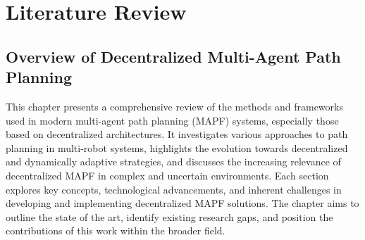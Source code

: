 \chapter{Literature Review}
\label{chap:literature_review}
\section{Overview of Decentralized Multi-Agent Path Planning}
This chapter presents a comprehensive review of the methods and frameworks used in modern multi-agent path planning (MAPF) systems, especially those based on decentralized architectures.
It investigates various approaches to path planning in multi-robot systems, highlights the evolution towards decentralized and dynamically adaptive strategies, and discusses the increasing relevance of decentralized MAPF in complex and uncertain environments. Each section explores key concepts, technological advancements, and inherent challenges in developing and implementing decentralized MAPF solutions. The chapter aims to outline the state of the art, identify existing research gaps, and position the contributions of this work within the broader field.

